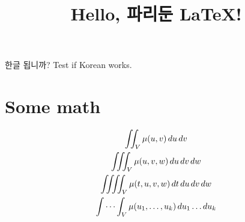 \documentclass[12pt]{article}
\begin{document}
\title{Hello, 파리둔 \LaTeX!}
\maketitle

한글 됩니까? Test if Korean works.

\section{Some math}
\begin{gather*}
    \iint_V \mu(u,v) \,du\,dv
\\
    \iiint_V \mu(u,v,w) \,du\,dv\,dw
\\
    \iiiint_V \mu(t,u,v,w) \,dt\,du\,dv\,dw
\\
    \idotsint_V \mu(u_1,\dots,u_k) \,du_1 \dots du_k
\end{gather*}
\end{document}
